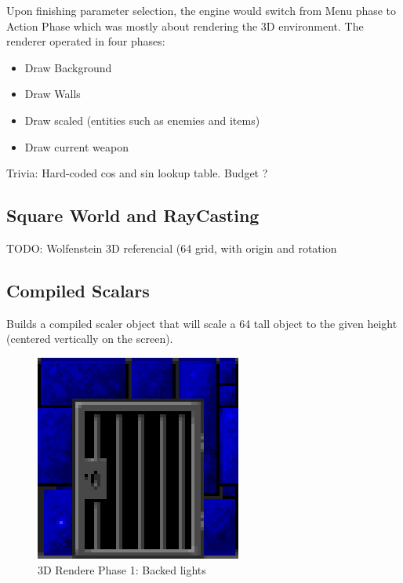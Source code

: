 \documentclass[book.tex]{subfiles}
\begin{document}
Upon finishing parameter selection, the engine would switch from Menu phase to Action Phase which was mostly about rendering the 3D environment. The renderer operated in four phases:
\begin{itemize}
   \item Draw Background
   \item Draw Walls
   \item Draw scaled (entities such as enemies and items)
   \item Draw current weapon
\end{itemize}


Trivia: Hard-coded cos and sin lookup table. Budget ? 

\subsection{Square World and RayCasting}
TODO: Wolfenstein 3D referencial (64 grid, with origin and rotation
\subsection{Compiled Scalars}
Builds a compiled scaler object that will scale a 64 tall object to the given height (centered vertically on the screen).
\\


  \begin{figure}[H]
\centering
 \includegraphics[scale=1.3]{imgs/wall_texturw.png}
 \caption{3D Rendere Phase 1: Backed lights} \label{fig:backee_lights}
 \end{figure}
\end{document}
